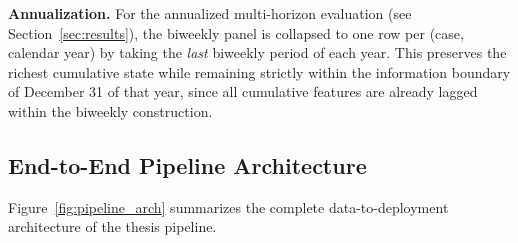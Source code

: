 \documentclass[11pt, letterpaper, oneside]{article}
\begin{document}
\textbf{Annualization.} For the annualized multi-horizon evaluation (see Section~\ref{sec:results}), the biweekly panel is collapsed to one row per (case, calendar year) by taking the \emph{last} biweekly period of each year. This preserves the richest cumulative state while remaining strictly within the information boundary of December 31 of that year, since all cumulative features are already lagged within the biweekly construction.



\subsection{End-to-End Pipeline Architecture}
\label{sec:pipeline_architecture}

Figure~\ref{fig:pipeline_arch} summarizes the complete data-to-deployment architecture of the thesis pipeline.
\end{document}
